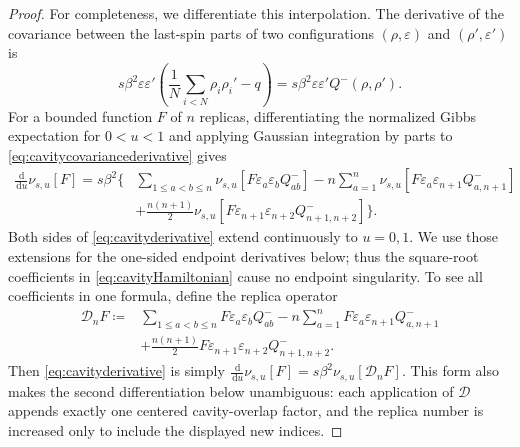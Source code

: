 \documentclass[11pt]{article}
\numberwithin{equation}{section}
\newcommand{\1}{\mathbf 1}
\newcommand{\dd}{\,\mathrm d}
\begin{document}
\begin{proof}
For completeness, we differentiate this interpolation.  The
derivative of the covariance between the last-spin parts of two
configurations $(\rho,\varepsilon)$ and
$(\rho',\varepsilon')$ is
\begin{equation}
 s\beta^2\varepsilon\varepsilon'
 \left(\frac1N\sum_{i<N}\rho_i\rho_i'-q\right)
 =s\beta^2\varepsilon\varepsilon'Q^-(\rho,\rho').
 \label{eq:cavitycovariancederivative}
\end{equation}
For a bounded function $F$ of $n$ replicas, differentiating the
normalized Gibbs expectation for $0<u<1$ and applying Gaussian
integration by parts to \eqref{eq:cavitycovariancederivative} gives
\begin{align}
 \frac{\dd}{\dd u}\nu_{s,u}[F]
 =s\beta^2\Bigg\{&
 \sum_{1\le a<b\le n}
 \nu_{s,u}[F\varepsilon_a\varepsilon_bQ^-_{ab}]
 -n\sum_{a=1}^n
 \nu_{s,u}[F\varepsilon_a\varepsilon_{n+1}Q^-_{a,n+1}]
 \nonumber\\
 &+\frac{n(n+1)}2
 \nu_{s,u}[F\varepsilon_{n+1}\varepsilon_{n+2}
 Q^-_{n+1,n+2}]\Bigg\}.
 \label{eq:cavityderivative}
\end{align}
Both sides of \eqref{eq:cavityderivative} extend continuously to
$u=0,1$.  We use those extensions for the one-sided endpoint
derivatives below; thus the square-root coefficients in
\eqref{eq:cavityHamiltonian} cause no endpoint singularity.
To see all coefficients in one formula, define the replica operator
\begin{align*}
 \mathcal D_nF\coloneqq{}&
 \sum_{1\le a<b\le n}
 F\varepsilon_a\varepsilon_bQ^-_{ab}
 -n\sum_{a=1}^n
 F\varepsilon_a\varepsilon_{n+1}Q^-_{a,n+1}\\
 &+\frac{n(n+1)}2
 F\varepsilon_{n+1}\varepsilon_{n+2}Q^-_{n+1,n+2}.
\end{align*}
Then \eqref{eq:cavityderivative} is simply
$\frac{\dd}{\dd u}\nu_{s,u}[F]
 =s\beta^2\nu_{s,u}[\mathcal D_nF]$.  This form also makes the
second differentiation below unambiguous: each application of
$\mathcal D$ appends exactly one centered cavity-overlap factor, and
the replica number is increased only to include the displayed new
indices.


\end{proof}
\end{document}
